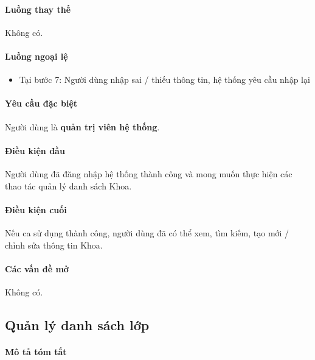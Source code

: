 \documentclass[./../main.tex]{subfiles}
\begin{document}
\paragraph*{Luồng thay thế} Không có.

\paragraph*{Luồng ngoại lệ}

\begin{itemize}
  \item
    
  Tại bước 7: Người dùng nhập sai / thiếu thông tin, hệ thống yêu cầu nhập lại
  
\end{itemize}

\paragraph*{Yêu cầu đặc biệt}

Người dùng là \textbf{quản trị viên hệ thống}.

\paragraph*{Điều kiện đầu}

Người dùng đã đăng nhập hệ thống thành công và mong muốn thực hiện các thao tác quản lý danh sách Khoa.

\paragraph*{Điều kiện cuối}

Nếu ca sử dụng thành công, người dùng đã có thể xem, tìm kiếm, tạo mới / chỉnh sửa thông tin Khoa.

\paragraph*{Các vấn đề mở}

Không có.

\subsection{Quản lý danh sách lớp}

\paragraph*{Mô tả tóm tắt}
\end{document}
